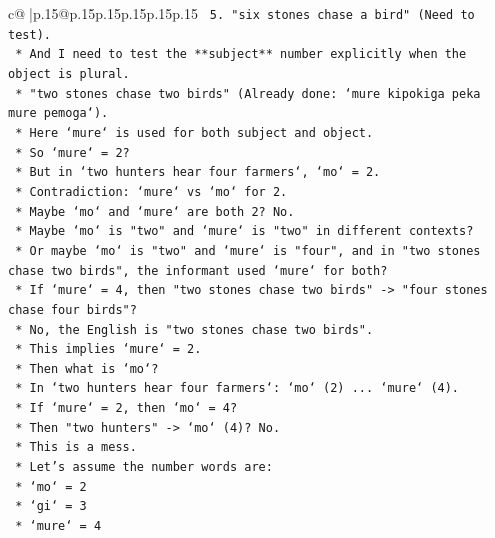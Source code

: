 \documentclass{article}
\begin{document}
{\begin{supertabular}{c@{$\;$}|p{.15\linewidth}@{}p{.15\linewidth}p{.15\linewidth}p{.15\linewidth}p{.15\linewidth}p{.15\linewidth}}
{{{\texttt{                    5.  "six stones chase a bird" (Need to test).} \\
\texttt{                *   And I need to test the **subject** number explicitly when the object is plural.} \\
\texttt{                *   "two stones chase two birds" (Already done: `mure kipokiga peka mure pemoga`).} \\
\texttt{                    *   Here `mure` is used for both subject and object.} \\
\texttt{                    *   So `mure` = 2?} \\
\texttt{                    *   But in `two hunters hear four farmers`, `mo` = 2.} \\
\texttt{                    *   Contradiction: `mure` vs `mo` for 2.} \\
\texttt{                    *   Maybe `mo` and `mure` are both 2? No.} \\
\texttt{                    *   Maybe `mo` is "two" and `mure` is "two" in different contexts?} \\
\texttt{                    *   Or maybe `mo` is "two" and `mure` is "four", and in "two stones chase two birds", the informant used `mure` for both?} \\
\texttt{                    *   If `mure` = 4, then "two stones chase two birds" {-}> "four stones chase four birds"?} \\
\texttt{                    *   No, the English is "two stones chase two birds".} \\
\texttt{                    *   This implies `mure` = 2.} \\
\texttt{                    *   Then what is `mo`?} \\
\texttt{                    *   In `two hunters hear four farmers`: `mo` (2) ... `mure` (4).} \\
\texttt{                    *   If `mure` = 2, then `mo` = 4?} \\
\texttt{                    *   Then "two hunters" {-}> `mo` (4)? No.} \\
\texttt{                    *   This is a mess.} \\
\texttt{                *   Let's assume the number words are:} \\
\texttt{                    *   `mo` = 2} \\
\texttt{                    *   `gi` = 3} \\
\texttt{                    *   `mure` = 4} \\
}}}
\end{supertabular}}
\end{document}
